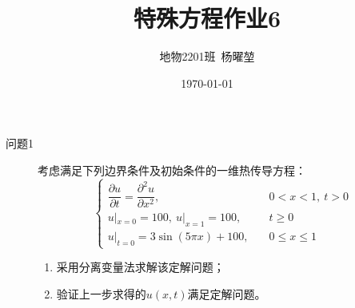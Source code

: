 \documentclass[12pt]{ctexart}
\title{特殊方程作业6}
\author{地物2201班\ 杨曜堃}
\date{\today}
\begin{document}
    \markboth{\theauthor}{\thetitle}
    \maketitle
    \begin{description}
        \item[问题1] 考虑满足下列边界条件及初始条件的一维热传导方程：
        $$
        \begin{cases}
            \dfrac{\partial u}{\partial t}=\dfrac{\partial^2u}{\partial x^2},&\quad 0<x<1,\ t>0\\
            u|_{x=0}=100,\ u|_{x=1}=100,&\quad t\geqslant0\\
            u|_{t=0}=3\sin(5\pi x)+100,&\quad 0\leqslant x\leqslant 1

        \end{cases}
        $$
        \begin{enumerate}
            \item 采用分离变量法求解该定解问题；
            \item 验证上一步求得的$u(x,t)$满足定解问题。
        \end{enumerate}
    \end{description}
\end{document}
